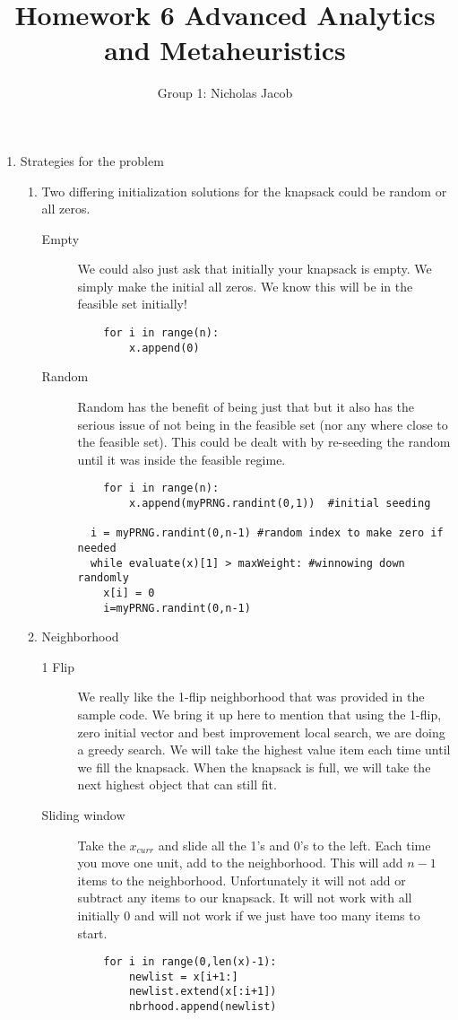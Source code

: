 \documentclass[11pt]{article}
\author{Group 1: Nicholas Jacob}
\title{Homework 6 Advanced Analytics and Metaheuristics}
\begin{document}
\maketitle

\begin{enumerate}
\item Strategies for the problem
\begin{enumerate}
\item Two differing initialization solutions for the knapsack could be random or all zeros.  
\begin{description}
\item[Empty]  We could also just ask that initially your knapsack is empty.  We simply make the initial all zeros.  We know this will be in the feasible set initially!
\begin{verbatim}
    for i in range(n):
        x.append(0)
\end{verbatim}
\item[Random]  Random has the benefit of being just that but it also has the serious issue of not being in the feasible set (nor any where close to the feasible set).  This could be dealt with by re-seeding the random until it was inside the feasible regime.  
\begin{verbatim}
    for i in range(n):
        x.append(myPRNG.randint(0,1))  #initial seeding

  i = myPRNG.randint(0,n-1) #random index to make zero if needed
  while evaluate(x)[1] > maxWeight: #winnowing down randomly
    x[i] = 0
    i=myPRNG.randint(0,n-1)
\end{verbatim}

\end{description}

\item Neighborhood
\begin{description}
\item [1 Flip]  We really like the 1-flip neighborhood that was provided in the sample code.  We bring it up here to mention that using the 1-flip, zero initial vector and best improvement local search, we are doing a greedy search.  We will take the highest value item each time until we fill the knapsack.  When the knapsack is full, we will take the next highest object that can still fit.
 


\item [Sliding window]  Take the $x_{curr}$ and slide all the 1's and 0's to the left.  Each time you move one unit, add to the neighborhood.  This will add $n-1$ items to the neighborhood.  Unfortunately it will not add or subtract any items to our knapsack.  It will not work with all initially 0 and will not work if we just have too many items to start. 
\begin{verbatim}
    for i in range(0,len(x)-1):
        newlist = x[i+1:]
        newlist.extend(x[:i+1])
        nbrhood.append(newlist)


\end{verbatim}
\end{description}
\end{enumerate}
\end{enumerate}
\end{document}
